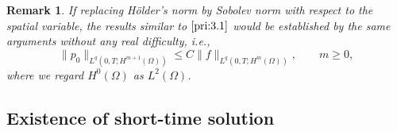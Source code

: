 \documentclass[13pt,CJK]{article}
\theoremstyle{plain}                       %
\newtheorem{remark}[lemma]{Remark}
\theoremstyle{remark}
\numberwithin{equation}{section}
\begin{document}
\begin{remark}
\emph{If replacing
H\"older's norm by Sobolev norm with respect to the spatial variable,
the results similar to $\eqref{pri:3.1}$ would be established by the
same arguments without any real difficulty, i.e.,
\begin{equation}\label{pri:3.12}
\|p_0\|_{L^q(0,T;H^{m+1}(\Omega))}\leq C
\|f\|_{L^q(0,T;H^{m}(\Omega))},
\qquad m\geq 0,
\end{equation}
where we regard $H^0(\Omega)$ as $L^2(\Omega)$.}
\end{remark}






\subsection{\centering Existence of short-time solution}


\end{document}
